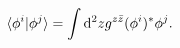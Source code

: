 \begin{equation}
\langle\phi^i | \phi^j\rangle = \int {\rm d}^2 z g^{z\bar z}
(\phi^i)^*\phi^j .
\end{equation} 
